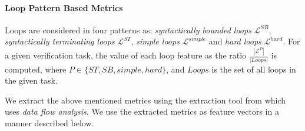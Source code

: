\paragraph{Loop Pattern Based Metrics}
Loops are considered in four patterns as: \emph{syntactically bounded loops} $\mathcal{L}^{SB}$, \emph{syntactically terminating loops} $\mathcal{L}^{ST}$, \emph{simple loops} $\mathcal{L}^{simple}$ and \emph{hard loops} $\mathcal{L}^{hard}$. For a given verification task, the value of each loop feature as the ratio $\frac{|\mathcal{L}^P|}{|Loops|}$ is computed, where $P \in \{ST, SB, simple, hard\}$, and $Loops$ is the set of all loops in the given task.

We extract the above mentioned metrics using the extraction tool from \cite{DPVF:tool} which uses \emph{data flow analysis}. We use the extracted metrics as feature vectors in a manner described below.
